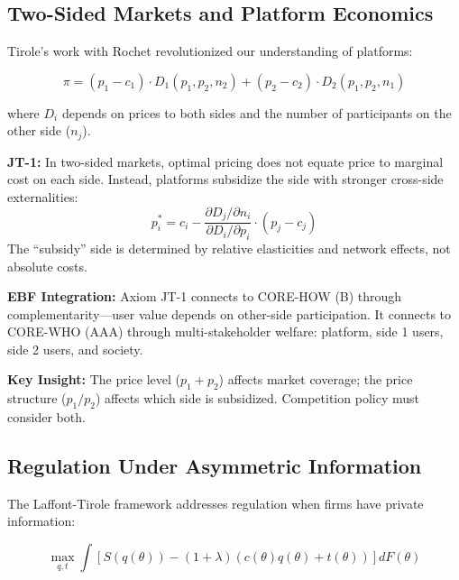 \subsection{Two-Sided Markets and Platform Economics}
\label{subsec:jt-platforms}

Tirole's work with Rochet \citep{tirole_rochet_2003_platform, tirole_rochet_2006_twosided} revolutionized our understanding of platforms:

\begin{equation}
\pi = (p_1 - c_1) \cdot D_1(p_1, p_2, n_2) + (p_2 - c_2) \cdot D_2(p_1, p_2, n_1)
\label{eq:jt-platform}
\end{equation}

where $D_i$ depends on prices to both sides and the number of participants on the other side ($n_j$).

\begin{axiom}
\label{ax:jt-1}
\textbf{JT-1:} In two-sided markets, optimal pricing does not equate price to marginal cost on each side. Instead, platforms subsidize the side with stronger cross-side externalities:
\begin{equation}
p_i^* = c_i - \frac{\partial D_j / \partial n_i}{\partial D_i / \partial p_i} \cdot (p_j - c_j)
\end{equation}
The ``subsidy'' side is determined by relative elasticities and network effects, not absolute costs.
\end{axiom}

\textbf{EBF Integration:} Axiom JT-1 connects to CORE-HOW (B) through complementarity---user value depends on other-side participation. It connects to CORE-WHO (AAA) through multi-stakeholder welfare: platform, side 1 users, side 2 users, and society.

\textbf{Key Insight:} The price level ($p_1 + p_2$) affects market coverage; the price structure ($p_1/p_2$) affects which side is subsidized. Competition policy must consider both.

\subsection{Regulation Under Asymmetric Information}
\label{subsec:jt-regulation}

The Laffont-Tirole framework \citep{tirole_laffont_1993_regulation} addresses regulation when firms have private information:

\begin{equation}
\max_{q, t} \int [S(q(\theta)) - (1+\lambda)(c(\theta)q(\theta) + t(\theta))] dF(\theta)
\label{eq:jt-regulation}
\end{equation}

